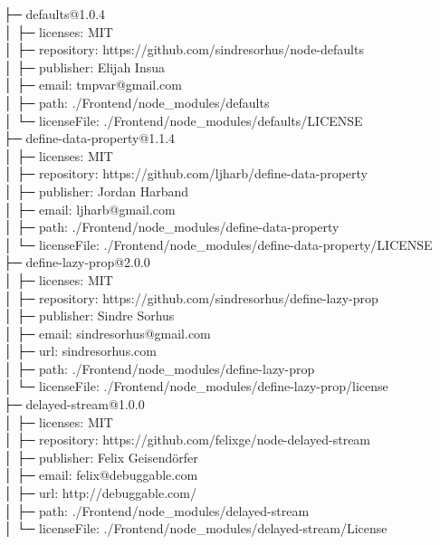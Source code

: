 \documentclass[
    paper=a4,
    twoside=false,
    parskip=half,
    listof=entryprefix,
    listof=totoc,
    index=totoc,
    bibliography=totoc,
    headsepline,
]{scrbook}
\begin{document}
    ├─ defaults@1.0.4\\
    │  ├─ licenses: MIT\\
    │  ├─ repository: https://github.com/sindresorhus/node-defaults\\
    │  ├─ publisher: Elijah Insua\\
    │  ├─ email: tmpvar@gmail.com\\
    │  ├─ path: ./Frontend/node\_modules/defaults\\
    │  └─ licenseFile: ./Frontend/node\_modules/defaults/LICENSE\\
    ├─ define-data-property@1.1.4\\
    │  ├─ licenses: MIT\\
    │  ├─ repository: https://github.com/ljharb/define-data-property\\
    │  ├─ publisher: Jordan Harband\\
    │  ├─ email: ljharb@gmail.com\\
    │  ├─ path: ./Frontend/node\_modules/define-data-property\\
    │  └─ licenseFile: ./Frontend/node\_modules/define-data-property/LICENSE\\
    ├─ define-lazy-prop@2.0.0\\
    │  ├─ licenses: MIT\\
    │  ├─ repository: https://github.com/sindresorhus/define-lazy-prop\\
    │  ├─ publisher: Sindre Sorhus\\
    │  ├─ email: sindresorhus@gmail.com\\
    │  ├─ url: sindresorhus.com\\
    │  ├─ path: ./Frontend/node\_modules/define-lazy-prop\\
    │  └─ licenseFile: ./Frontend/node\_modules/define-lazy-prop/license\\
    ├─ delayed-stream@1.0.0\\
    │  ├─ licenses: MIT\\
    │  ├─ repository: https://github.com/felixge/node-delayed-stream\\
    │  ├─ publisher: Felix Geisendörfer\\
    │  ├─ email: felix@debuggable.com\\
    │  ├─ url: http://debuggable.com/\\
    │  ├─ path: ./Frontend/node\_modules/delayed-stream\\
    │  └─ licenseFile: ./Frontend/node\_modules/delayed-stream/License\\
\end{document}

